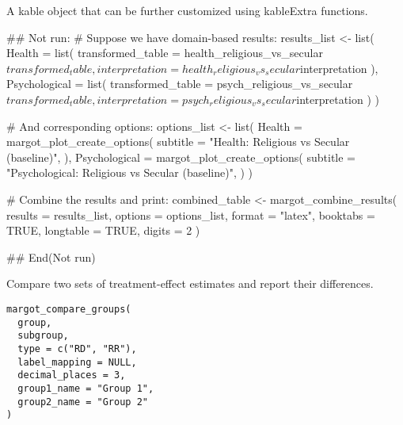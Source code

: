\documentclass[a4paper]{book}
\begin{document}
%
\begin{Value}
A kable object that can be further customized using kableExtra functions.
\end{Value}
%
\begin{Examples}
\begin{ExampleCode}
## Not run: 
# Suppose we have domain-based results:
results_list <- list(
  Health = list(
    transformed_table = health_religious_vs_secular$transformed_table,
    interpretation = health_religious_vs_secular$interpretation
  ),
  Psychological = list(
    transformed_table = psych_religious_vs_secular$transformed_table,
    interpretation = psych_religious_vs_secular$interpretation
  )
)

# And corresponding options:
options_list <- list(
  Health = margot_plot_create_options(
    subtitle = "Health: Religious vs Secular (baseline)",
  ),
  Psychological = margot_plot_create_options(
    subtitle = "Psychological: Religious vs Secular (baseline)",
  )
)

# Combine the results and print:
combined_table <- margot_combine_results(
  results = results_list,
  options = options_list,
  format = "latex",
  booktabs = TRUE,
  longtable = TRUE,
  digits = 2
)

## End(Not run)
\end{ExampleCode}
\end{Examples}
%
\begin{Description}
Compare two sets of treatment-effect estimates and report their differences.
\end{Description}
%
\begin{Usage}
\begin{verbatim}
margot_compare_groups(
  group,
  subgroup,
  type = c("RD", "RR"),
  label_mapping = NULL,
  decimal_places = 3,
  group1_name = "Group 1",
  group2_name = "Group 2"
)
\end{verbatim}
\end{Usage}
%
\end{document}
